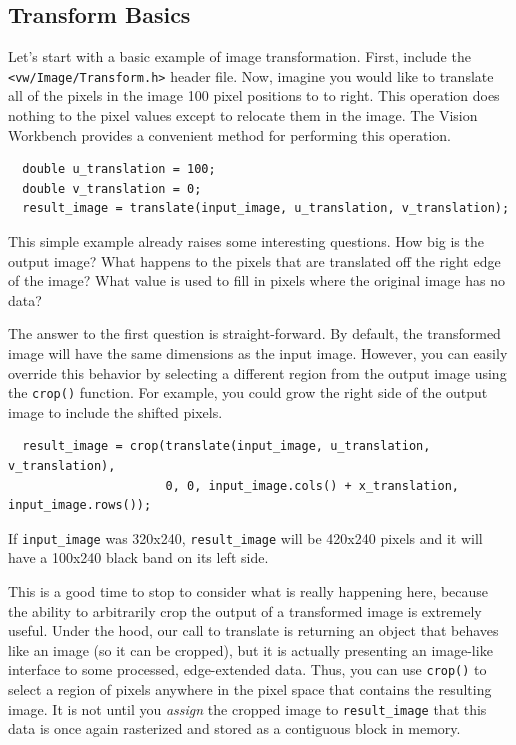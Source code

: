 \subsection{Transform Basics}

Let's start with a basic example of image transformation.  First,
include the \verb#<vw/Image/Transform.h># header file.  Now, imagine
you would like to translate all of the pixels in the image 100 pixel
positions to to right.  This operation does nothing to the pixel
values except to relocate them in the image.  The Vision Workbench
provides a convenient method for performing this operation.

\begin{verbatim}
  double u_translation = 100;
  double v_translation = 0;
  result_image = translate(input_image, u_translation, v_translation);
\end{verbatim}

This simple example already raises some interesting questions.  How
big is the output image?  What happens to the pixels that are
translated off the right edge of the image?  What value is used to
fill in pixels where the original image has no data?

The answer to the first question is straight-forward.  By default, the
transformed image will have the same dimensions as the input image.
However, you can easily override this behavior by selecting a
different region from the output image using the \verb#crop()#
function.  For example, you could grow the right side of the output
image to include the shifted pixels.

\begin{verbatim} 
  result_image = crop(translate(input_image, u_translation, v_translation), 
                      0, 0, input_image.cols() + x_translation, input_image.rows());
\end{verbatim}

If \verb#input_image# was 320x240, \verb#result_image# will be 420x240
pixels and it will have a 100x240 black band on its left side.

This is a good time to stop to consider what is really happening here,
because the ability to arbitrarily crop the output of a transformed
image is extremely useful.  Under the hood, our call to translate is
returning an object that behaves like an image (so it can be cropped),
but it is actually presenting an image-like interface to some
processed, edge-extended data.  Thus, you can use \verb#crop()# to
select a region of pixels anywhere in the pixel space that contains
the resulting image.  It is not until you {\em assign} the cropped
image to \verb#result_image# that this data is once again rasterized
and stored as a contiguous block in memory.

